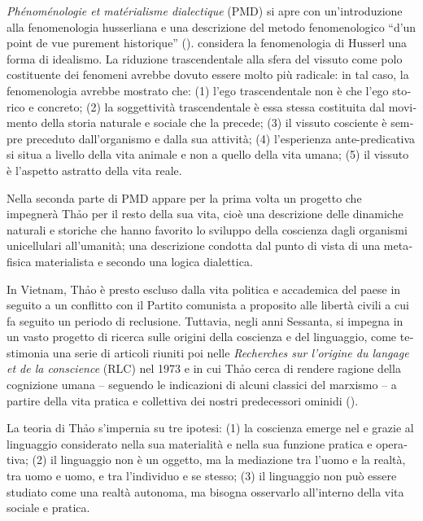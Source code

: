 \documentclass[output=paper]{../langscibook}
\begin{document}
\begin{otherlanguage}{italian}
\textit{Phénoménologie et matérialisme dialectique} (PMD) si apre con un’introduzione alla fenomenologia husserliana e una descrizione del metodo fenomenologico “d’un point de vue purement historique” (\citealt[5]{thao_phenomenologie_1951}). \citet[7]{thao_phenomenologie_1951} considera la fenomenologia di Husserl una forma di idealismo. La riduzione trascendentale alla sfera del vissuto come polo costituente dei fenomeni avrebbe dovuto essere molto più radicale: in tal caso, la fenomenologia avrebbe mostrato che:
(1) l’ego trascendentale non è che l’ego storico e concreto;
(2) la soggettività trascendentale è essa stessa costituita dal movimento della storia naturale e sociale che la precede;
(3) il vissuto cosciente è sempre preceduto dall’organismo e dalla sua attività;
(4) l’esperienza ante-predicativa si situa a livello della vita animale e non a quello della vita umana;
(5) il vissuto è l’aspetto astratto della vita reale.

Nella seconda parte di PMD appare per la prima volta un progetto che impegnerà Th\textlatin{ả}o per il resto della sua vita, cioè una descrizione delle dinamiche naturali e storiche che hanno favorito lo sviluppo della coscienza dagli organismi unicellulari all’umanità; una descrizione condotta dal punto di vista di una metafisica materialista e secondo una logica dialettica.

In Vietnam, Thảo è presto escluso dalla vita politica e accademica del paese in seguito a un conflitto con il Partito comunista a proposito alle libertà civili a cui fa seguito un periodo di reclusione. Tuttavia, negli anni Sessanta, si impegna in un vasto progetto di ricerca sulle origini della coscienza e del linguaggio, come testimonia una serie di articoli \citep{thao_du_1969,thao_du_1969-1,thao_du_1970} riuniti poi nelle \textit{Recherches sur l’origine du langage et de la conscience} (RLC) nel 1973 e in cui Thảo cerca di rendere ragione della cognizione umana – seguendo le indicazioni di alcuni classici del marxismo – a partire della vita pratica e collettiva dei nostri predecessori ominidi (\citealt{federici_viet_1970,caveing_recherche_1974,haudricourt_tran_1974,frederic_tran_1974}).

La teoria di Thảo s’impernia su tre ipotesi: (1) la coscienza emerge nel e grazie al linguaggio considerato nella sua materialità e nella sua funzione pratica e operativa; (2) il linguaggio non è un oggetto, ma la mediazione tra l’uomo e la realtà, tra uomo e uomo, e tra l’individuo e se stesso; (3) il linguaggio non può essere studiato come una realtà autonoma, ma bisogna osservarlo all’interno della vita sociale e pratica.


\end{otherlanguage}
\end{document}
